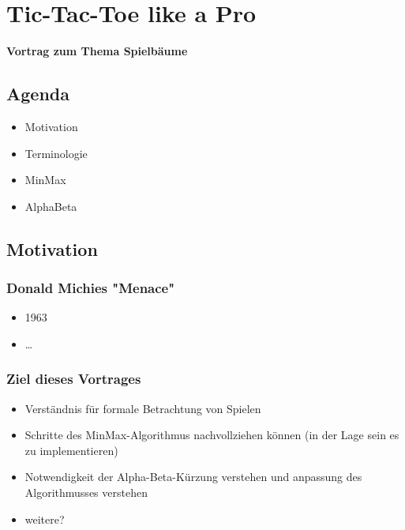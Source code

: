 \documentclass[]{article}
\date{}
\begin{document}
\hypertarget{header-n0}{%
\section{Tic-Tac-Toe like a Pro}\label{header-n0}}

\textbf{Vortrag zum Thema Spielbäume}

\hypertarget{header-n20}{%
\subsection{Agenda}\label{header-n20}}

\begin{itemize}
\item
  Motivation
\item
  Terminologie
\item
  MinMax
\item
  AlphaBeta
\end{itemize}

\hypertarget{header-n27}{%
\subsection{Motivation}\label{header-n27}}

\hypertarget{header-n34}{%
\subsubsection{Donald Michies "Menace"}\label{header-n34}}

\begin{itemize}
\item
  1963
\item
  \ldots{}
\end{itemize}

\hypertarget{header-n1199}{%
\subsubsection{Ziel dieses Vortrages}\label{header-n1199}}

\begin{itemize}
\item
  Verständnis für formale Betrachtung von Spielen
\item
  Schritte des MinMax-Algorithmus nachvollziehen können (in der Lage
  sein es zu implementieren)
\item
  Notwendigkeit der Alpha-Beta-Kürzung verstehen und anpassung des
  Algorithmusses verstehen
\item
  weitere?
\end{itemize}
\end{document}
